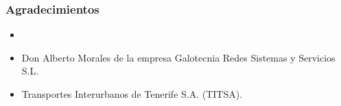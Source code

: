 \begin{frame}
  \frametitle{Agradecimientos}
    \begin{itemize}
    \item 
		\item Don Alberto Morales de la empresa Galotecnia Redes Sistemas y Servicios S.L.
		\item Transportes Interurbanos de Tenerife S.A. (TITSA).
    \end{itemize}
  \endblock{}
\end{frame}